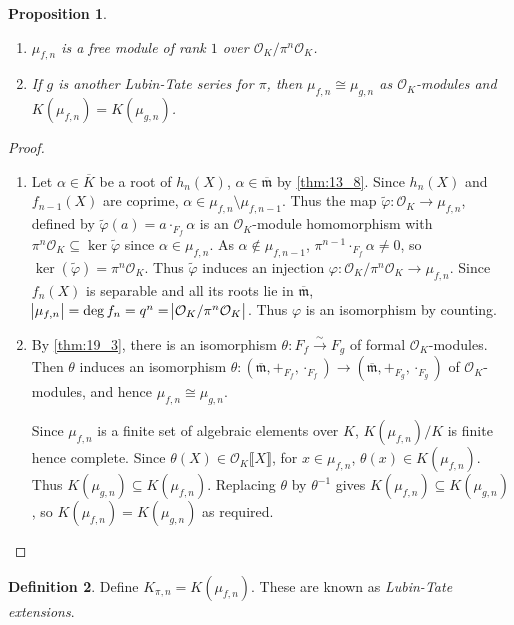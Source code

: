 \documentclass[11pt]{article}
\theoremstyle{definition}
\newtheorem{definition}{Definition}[subsection]
\theoremstyle{plain}
\newtheorem{proposition}[definition]{Proposition}
\theoremstyle{remark}
\newcommand{\cO}{\mathcal{O}}
\newcommand{\fm}{\mathfrak{m}}
\begin{document}
\begin{proposition}\label{prop:20:4}\phantom{}
    \begin{enumerate}
        \item $\mu_{f,n}$ is a free module of rank $1$ over $\cO_K / \pi^n \cO_K$.
        \item If $g$ is another Lubin-Tate series for $\pi$, then $\mu_{f, n} \cong \mu_{g, n}$ as $\cO_K$-modules and $K(\mu_{f,n}) = K(\mu_{g, n})$.
    \end{enumerate}
\end{proposition}
\begin{proof}\phantom{}
    \begin{enumerate}
        \item Let $\alpha \in \overline{K}$ be a root of $h_n(X)$, $\alpha \in \overline{\fm}$ by \autoref{thm:13_8}. Since $h_n(X)$ and $f_{n-1}(X)$ are coprime, $\alpha \in \mu_{f,n} \setminus \mu_{f,n-1}$. Thus the map $\widetilde{\varphi} : \cO_K \to \mu_{f, n}$, defined by $\widetilde{\varphi}(a) = a \cdot_{F_f} \alpha$ is an $\cO_K$-module homomorphism with $\pi^n \cO_K \subseteq \ker{\widetilde{\varphi}}$ since $\alpha \in \mu_{f,n}$. As $\alpha \notin \mu_{f,n-1}$, $\pi^{n-1} \cdot_{F_f} \alpha \neq 0$, so $\ker(\widetilde{\varphi}) = \pi^n \cO_K$. Thus $\widetilde{\varphi}$ induces an injection $\varphi : \cO_K / \pi^n \cO_K \to \mu_{f,n}$. Since $f_n(X)$ is separable and all its roots lie in $\overline{\fm}$, $\abs{\mu_{f,n}} = \deg f_n = q^n = \abs{\cO_K / \pi^n \cO_K}$. Thus $\varphi$ is an isomorphism by counting.

        \item By \autoref{thm:19_3}, there is an isomorphism $\theta : F_f \xrightarrow{\sim} F_g$ of formal $\cO_K$-modules. Then $\theta$ induces an isomorphism $\theta : (\overline{\fm}, +_{F_f}, \cdot_{F_f}) \to (\overline{\fm}, +_{F_g}, \cdot_{F_g})$ of $\cO_K$-modules, and hence $\mu_{f,n} \cong \mu_{g,n}$.

            Since $\mu_{f,n}$ is a finite set of algebraic elements over $K$, $K(\mu_{f,n})/K$ is finite hence complete. Since $\theta(X) \in \cO_K \llbracket X \rrbracket$, for $x \in \mu_{f,n}$, $\theta(x) \in K(\mu_{f,n})$. Thus $K(\mu_{g,n}) \subseteq K(\mu_{f,n})$. Replacing $\theta$ by $\theta^{-1}$ gives $K(\mu_{f,n}) \subseteq K(\mu_{g,n})$, so $K(\mu_{f,n}) = K(\mu_{g,n})$ as required. \qedhere
    \end{enumerate}
\end{proof}

\begin{definition}\label{def:20_5}
    Define $K_{\pi,n} = K(\mu_{f,n})$. These are known as \emph{Lubin-Tate extensions}.
\end{definition}
\end{document}
